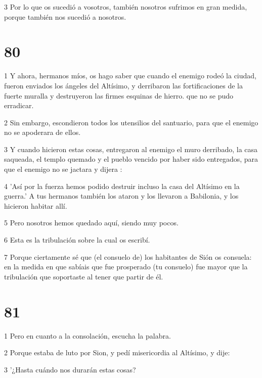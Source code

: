 \par 3 Por lo que os sucedió a vosotros, también nosotros sufrimos en gran medida, porque también nos sucedió a nosotros.

\chapter{80}

\par 1 Y ahora, hermanos míos, os hago saber que cuando el enemigo rodeó la ciudad, fueron enviados los ángeles del Altísimo, y derribaron las fortificaciones de la fuerte muralla y destruyeron las firmes esquinas de hierro. que no se pudo erradicar.

\par 2 Sin embargo, escondieron todos los utensilios del santuario, para que el enemigo no se apoderara de ellos.

\par 3 Y cuando hicieron estas cosas, entregaron al enemigo el muro derribado, la casa saqueada, el templo quemado y el pueblo vencido por haber sido entregados, para que el enemigo no se jactara y dijera :

\par 4 'Así por la fuerza hemos podido destruir incluso la casa del Altísimo en la guerra.' A tus hermanos también los ataron y los llevaron a Babilonia, y los hicieron habitar allí.

\par 5 Pero nosotros hemos quedado aquí, siendo muy pocos.

\par 6 Esta es la tribulación sobre la cual os escribí.

\par 7 Porque ciertamente sé que (el consuelo de) los habitantes de Sión os consuela: en la medida en que sabíais que fue prosperado (tu consuelo) fue mayor que la tribulación que soportaste al tener que partir de él.

\chapter{81}

\par 1 Pero en cuanto a la consolación, escucha la palabra.

\par 2 Porque estaba de luto por Sion, y pedí misericordia al Altísimo, y dije:

\par 3 '¿Hasta cuándo nos durarán estas cosas?

